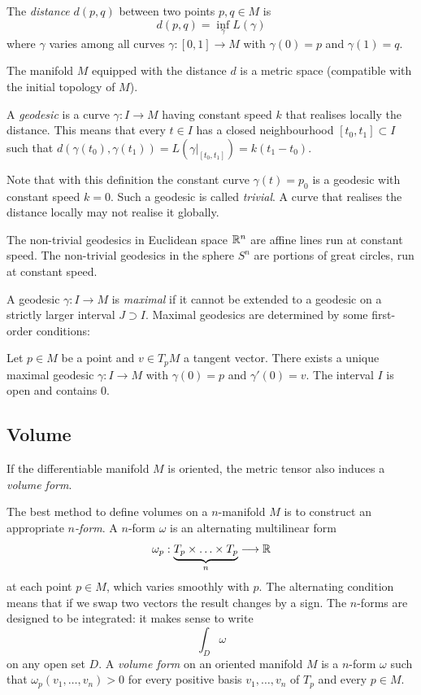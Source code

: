 \begin{defn}
The \emph{distance} $d(p,q)$ between two points $p, q\in M$ is 
$$d(p,q) = \inf_\gamma L(\gamma)$$
where $\gamma$ varies among all curves $\gamma\colon [0,1] \to M$ with $\gamma(0)=p$ and $\gamma(1)=q$. 
\end{defn}
The manifold $M$ equipped with the distance $d$ is a metric space (compatible with the initial topology of $M$).

\begin{defn}
A \emph{geodesic} is a curve $\gamma\colon I \to M$ having constant speed $k$ that realises locally the distance. This means that every $t \in I$ has a closed neighbourhood $[t_0,t_1]\subset I$ such that $d(\gamma(t_0), \gamma(t_1)) = L(\gamma|_{[t_0,t_1]}) = k(t_1-t_0)$.
\end{defn}

Note that with this definition the constant curve $\gamma(t) = p_0$ is a geodesic with constant speed $k=0$. Such a geodesic is called \emph{trivial}. A curve that realises the distance locally may not realise it globally. 

\begin{example}
The non-trivial geodesics in Euclidean space $\mathbb{R}^n$ are affine lines run at constant speed. 
The non-trivial geodesics in the sphere $S^n$ are portions of great circles, run at constant speed. 
\end{example}

A geodesic $\gamma:I \to M$ is \emph{maximal} if it cannot be extended to a geodesic on a strictly larger interval $J \supset I$. Maximal geodesics are determined by some first-order conditions: 

\begin{teo}  \label{geod:teo}
Let $p\in M$ be a point and $v\in T_pM$ a tangent vector. There exists a unique maximal geodesic $\gamma\colon I \to M$ with $\gamma(0) = p$ and $\gamma'(0) = v$. The interval $I$ is open and contains $0$.
\end{teo}

\subsection{Volume}
If the differentiable manifold $M$ is oriented, the metric tensor also induces a \emph{volume form}.

The best method to define volumes on a $n$-manifold $M$ is to construct an appropriate \emph{$n$-form}. A $n$-form $\omega$ is an alternating multilinear form
$$\omega_p: \underbrace{T_p \times \ldots \times T_p}_n \longrightarrow \mathbb{R}$$
at each point $p\in M$, which varies smoothly with $p$. The alternating condition means that if we swap two vectors the result changes by a sign. 
The $n$-forms are designed to be integrated: it makes sense to write 
$$\int_D \omega$$
on any open set $D$. A \emph{volume form} on an oriented manifold $M$ is a $n$-form $\omega$ such that $\omega_p(v_1,\ldots, v_n)> 0$ for every positive basis $v_1,\ldots, v_n$ of $T_p$ and every $p\in M$. 

